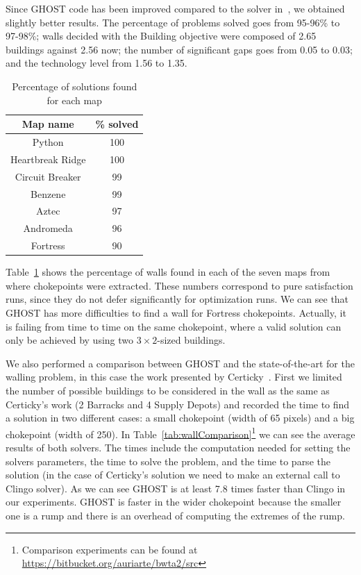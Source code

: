 \documentclass[journal]{IEEEtran}
\newcommand{\ghost}{\textsc{GHOST}\xspace}
\begin{document}
Since  \ghost   code  has  been   improved  compared  to   the  solver
in~\cite{RichouxUO14},  we  obtained   slightly  better  results.  The
percentage  of problems  solved goes  from 95-96\%  to 97-98\%;  walls
decided with  the Building objective  were composed of  2.65 buildings
against 2.56  now; the number  of significant  gaps goes from  0.05 to
0.03; and the technology level from 1.56 to 1.35.
\begin{table}[ht]
  \caption{Percentage of solutions found for each map}
    \label{tab:map}
    \centering
    \begin{tabular}{|c|c|}
      \hline
      Map name & \% solved\\
      \hline
      Python & 100\\
      Heartbreak Ridge & 100\\
      Circuit Breaker & 99\\
      Benzene & 99\\
      Aztec & 97\\
      Andromeda & 96\\
      Fortress & 90\\
      \hline
    \end{tabular}
\end{table}
Table~\ref{tab:map} shows the percentage of walls found in each of the
seven  maps  from where  chokepoints  were  extracted.  These  numbers
correspond  to  pure  satisfaction  runs,  since  they  do  not  defer
significantly for optimization  runs. We can see that  \ghost has more
difficulties to find a wall  for Fortress chokepoints. Actually, it is
failing  from time  to  time on  the same  chokepoint,  where a  valid
solution  can  only  be  achieved  by using  two  $3  \times  2$-sized
buildings.


We also performed a comparison between \ghost and the state-of-the-art for the walling problem, in this case the work presented by Certicky~\cite{Certicky13}. First we limited the number of possible buildings to be considered in the wall as the same as Certicky's work (2 Barracks and 4 Supply Depots) and recorded the time to find a solution in two different cases: a small chokepoint (width of 65 pixels) and a big chokepoint (width of 250). In Table~\ref{tab:wallComparison}\footnote{Comparison experiments can be found at \url{https://bitbucket.org/auriarte/bwta2/src}} we can see the average results of both solvers. The times include the computation needed for setting the solvers parameters, the time to solve the problem, and the time to parse the solution (in the case of Certicky's solution we need to make an external call to Clingo solver). As we can see \ghost is at least 7.8 times faster than Clingo in our experiments. \ghost is faster in the wider chokepoint because the smaller one is a rump and there is an overhead of computing the extremes of the rump.
\end{document}
